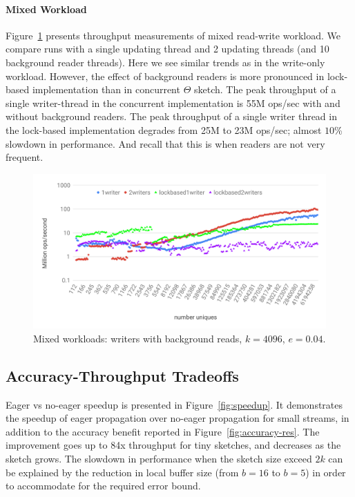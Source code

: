 \paragraph{Mixed Workload}
Figure~\ref{fig:mixed-throughput} presents throughput measurements of mixed read-write workload. We compare runs with a single updating thread and 2 updating threads (and 10 background reader threads).
Here we see similar trends as in the write-only workload. However, the effect of  background readers is more pronounced in lock-based implementation than in concurrent $\Theta$ sketch. The peak throughput of a single writer-thread in the concurrent implementation is 55M ops/sec with and without background readers. The peak throughput of a single writer thread in the lock-based implementation degrades from 25M to 23M ops/sec; almost $10$\% slowdown in performance. And recall that this is when readers are not very frequent.

\begin{figure}[tb]
\setlength{\abovecaptionskip}{0pt}
\setlength{\belowcaptionskip}{0pt}
\setlength\textfloatsep{0pt}
	\centering
	\includegraphics[width=\columnwidth]{images/theta-mixed.pdf}
	\caption{{Mixed workloads: writers with background reads, $k = 4096$, $e=0.04$.}}
	\label{fig:mixed-throughput}
\end{figure}


\subsection{Accuracy-Throughput Tradeoffs}
\label{ssec:tradeoffs}

Eager vs no-eager speedup is presented in Figure~\ref{fig:speedup}. It demonstrates the speedup of eager propagation over no-eager propagation for small streams, in addition to the accuracy benefit reported in Figure~\ref{fig:accuracy-res}. 
The improvement goes up to 84x throughput for tiny sketches, and decreases as the sketch grows. %
The slowdown in performance when the sketch size exceed $2k$ can be explained by the reduction in local buffer size (from $b=16$ to $b=5$) in order to accommodate for the required error bound.

